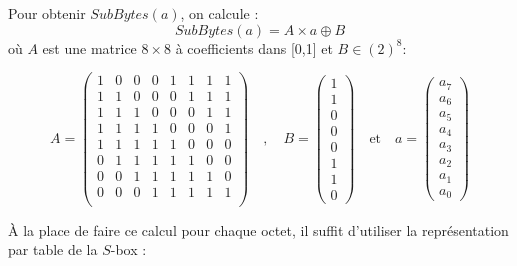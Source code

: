 Pour obtenir $SubBytes(a)$, on calcule :
$$ SubBytes(a) = A \times a \oplus B$$
où $A$ est une matrice $8\times 8$ à coefficients dans [0,1] et $B\in (2)^8$:

\def\MatriceSubBytesA{
\begin{pmatrix}
1&0&0&0&1&1&1&1\\
1&1&0&0&0&1&1&1\\
1&1&1&0&0&0&1&1\\
1&1&1&1&0&0&0&1\\
1&1&1&1&1&0&0&0\\
0&1&1&1&1&1&0&0\\
0&0&1&1&1&1&1&0\\
0&0&0&1&1&1&1&1\\
\end{pmatrix}
}

\def\MatriceSubBytesB{
\begin{pmatrix}
1\\
1\\
0\\
0\\
0\\
1\\
1\\
0
\end{pmatrix}
}

\def\MatriceSingle#1{
  \begin{pmatrix}
  #1_{7} \\
  #1_{6} \\
  #1_{5} \\
  #1_{4} \\
  #1_{3} \\
  #1_{2} \\
  #1_{1} \\
  #1_{0}
  \end{pmatrix}
}

$$
A = \MatriceSubBytesA{}\quad , \quad
B = \MatriceSubBytesB{} \quad \text{et} \quad  a = \MatriceSingle{a}
$$

À la place de faire ce calcul pour chaque octet, il suffit d'utiliser la représentation par table de la $S$-box :

